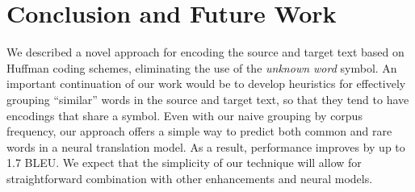 \section{Conclusion and Future Work}
\label{sec:conclusion}

We described a novel approach for encoding the source and target text based on
Huffman coding schemes, eliminating the use of the \emph{unknown word} symbol.
An important continuation of our work would be to develop heuristics for
effectively grouping ``similar'' words in the source and target text, so that
they tend to have encodings that share a symbol. Even with our naive grouping
by corpus frequency, our approach offers a simple way to predict both common
and rare words in a neural translation model. As a result, performance improves
by up to 1.7 BLEU. We expect that the simplicity of our technique will allow
for straightforward combination with other enhancements and neural models.
